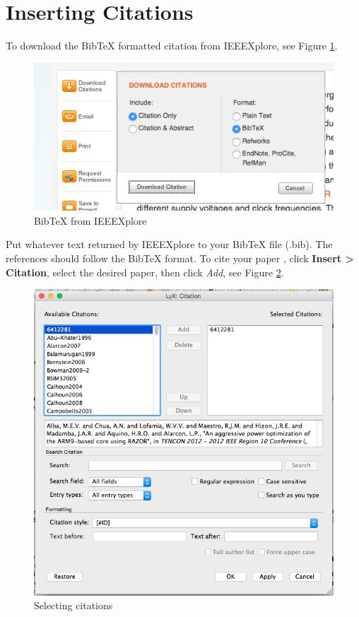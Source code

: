 \section{Inserting Citations}

To download the Bib\TeX{} formatted citation from IEEEXplore, see Figure
\ref{fig:BibTeX-from-IEEEXplore}.

\begin{figure}[H]
\begin{centering}
\includegraphics[width=0.55\columnwidth]{images/bibtex}
\par\end{centering}
\caption{Bib\protect\TeX{} from IEEEXplore\label{fig:BibTeX-from-IEEEXplore}}
\end{figure}

Put whatever text returned by IEEEXplore to your Bib\TeX{} file (.bib).
The references should follow the Bib\TeX{} format. To cite your paper
, click \textbf{Insert \textgreater{} Citation}, select
the desired paper, then click \textit{Add}, see Figure \ref{fig:Selecting-citations}. 

\begin{figure}[H]
\begin{centering}
\includegraphics[width=0.7\columnwidth]{images/papers}
\par\end{centering}
\caption{Selecting citations \label{fig:Selecting-citations}}

\end{figure}

